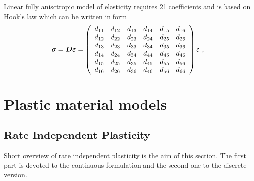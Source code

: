 Linear fully anisotropic model of elasticity requires 21 coefficients and
is based on Hook's law which can be written in form
\begin{equation}
\mbox{\boldmath$\sigma$} = \mbox{\boldmath$D$} \mbox{\boldmath$\varepsilon$} =
\left(\begin{array}{cccccc}
d_{11} & d_{12} & d_{13} & d_{14} & d_{15} & d_{16}
\\
d_{12} & d_{22} & d_{23} & d_{24} & d_{25} & d_{26}
\\
d_{13} & d_{23} & d_{33} & d_{34} & d_{35} & d_{36}
\\
d_{14} & d_{24} & d_{34} & d_{44} & d_{45} & d_{46}
\\
d_{15} & d_{25} & d_{35} & d_{45} & d_{55} & d_{56}
\\
d_{16} & d_{26} & d_{36} & d_{46} & d_{56} & d_{66}
\\
\end{array}\right)
\mbox{\boldmath$\varepsilon$}\ ,
\end{equation}


\section{Plastic material models}
\label{sectplasmatmodels}

\subsection{Rate Independent Plasticity}
Short overview of rate independent plasticity is the aim of this section. The first part is
devoted to the continuous formulation and the second one to the discrete version.

